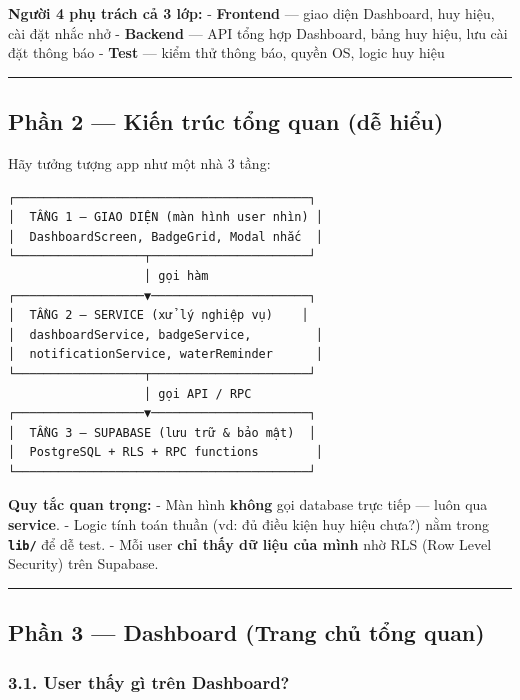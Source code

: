 \documentclass[12pt,a4paper]{article}
\begin{document}
\textbf{Người 4 phụ trách cả 3 lớp:} - \textbf{Frontend} --- giao diện
Dashboard, huy hiệu, cài đặt nhắc nhở - \textbf{Backend} --- API tổng
hợp Dashboard, bảng huy hiệu, lưu cài đặt thông báo - \textbf{Test} ---
kiểm thử thông báo, quyền OS, logic huy hiệu

\begin{center}\rule{0.5\linewidth}{0.5pt}\end{center}

\subsection{Phần 2 --- Kiến trúc tổng quan (dễ
hiểu)}\label{phux1ea7n-2-kiux1ebfn-truxfac-tux1ed5ng-quan-dux1ec5-hiux1ec3u}

Hãy tưởng tượng app như một nhà 3 tầng:

\begin{verbatim}
┌─────────────────────────────────────────┐
│  TẦNG 1 — GIAO DIỆN (màn hình user nhìn) │
│  DashboardScreen, BadgeGrid, Modal nhắc  │
└──────────────────┬──────────────────────┘
                   │ gọi hàm
┌──────────────────▼──────────────────────┐
│  TẦNG 2 — SERVICE (xử lý nghiệp vụ)    │
│  dashboardService, badgeService,         │
│  notificationService, waterReminder      │
└──────────────────┬──────────────────────┘
                   │ gọi API / RPC
┌──────────────────▼──────────────────────┐
│  TẦNG 3 — SUPABASE (lưu trữ & bảo mật)  │
│  PostgreSQL + RLS + RPC functions        │
└─────────────────────────────────────────┘
\end{verbatim}

\textbf{Quy tắc quan trọng:} - Màn hình \textbf{không} gọi database trực
tiếp --- luôn qua \textbf{service}. - Logic tính toán thuần (vd: đủ điều
kiện huy hiệu chưa?) nằm trong \textbf{\texttt{lib/}} để dễ test. - Mỗi
user \textbf{chỉ thấy dữ liệu của mình} nhờ RLS (Row Level Security)
trên Supabase.

\begin{center}\rule{0.5\linewidth}{0.5pt}\end{center}

\subsection{Phần 3 --- Dashboard (Trang chủ tổng
quan)}\label{phux1ea7n-3-dashboard-trang-chux1ee7-tux1ed5ng-quan}

\subsubsection{3.1. User thấy gì trên
Dashboard?}\label{user-thux1ea5y-guxec-truxean-dashboard}
\end{document}
